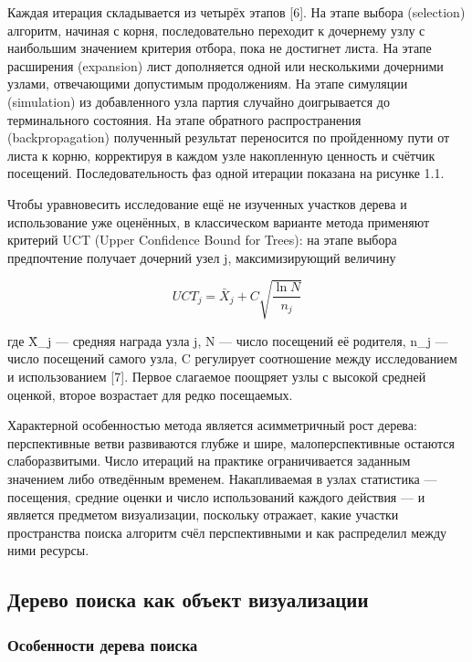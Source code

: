 Каждая итерация складывается из четырёх этапов [6]. На этапе выбора (selection) алгоритм, начиная с корня, последовательно переходит к дочернему узлу с наибольшим значением критерия отбора, пока не достигнет листа. На этапе расширения (expansion) лист дополняется одной или несколькими дочерними узлами, отвечающими допустимым продолжениям. На этапе симуляции (simulation) из добавленного узла партия случайно доигрывается до терминального состояния. На этапе обратного распространения (backpropagation) полученный результат переносится по пройденному пути от листа к корню, корректируя в каждом узле накопленную ценность и счётчик посещений. Последовательность фаз одной итерации показана на рисунке 1.1.


Чтобы уравновесить исследование ещё не изученных участков дерева и использование уже оценённых, в классическом варианте метода применяют критерий UCT (Upper Confidence Bound for Trees): на этапе выбора предпочтение получает дочерний узел j, максимизирующий величину

\begin{equation}
UCT_j = \bar{X}_j + C\sqrt{\dfrac{\ln N}{n_j}}
\end{equation}

где X̄\_j — средняя награда узла j, N — число посещений её родителя, n\_j — число посещений самого узла, C регулирует соотношение между исследованием и использованием [7]. Первое слагаемое поощряет узлы с высокой средней оценкой, второе возрастает для редко посещаемых.

Характерной особенностью метода является асимметричный рост дерева: перспективные ветви развиваются глубже и шире, малоперспективные остаются слаборазвитыми. Число итераций на практике ограничивается заданным значением либо отведённым временем. Накапливаемая в узлах статистика — посещения, средние оценки и число использований каждого действия — и является предметом визуализации, поскольку отражает, какие участки пространства поиска алгоритм счёл перспективными и как распределил между ними ресурсы.

\subsection{Дерево поиска как объект визуализации}

\subsubsection{Особенности дерева поиска}


